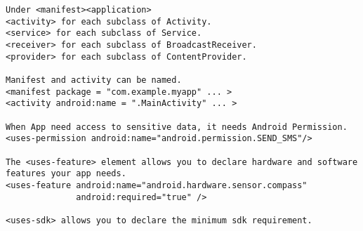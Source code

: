 \documentclass[12pt]{article}
\begin{document}
\begin{verbatim}
Under <manifest><application>
<activity> for each subclass of Activity.
<service> for each subclass of Service.
<receiver> for each subclass of BroadcastReceiver.
<provider> for each subclass of ContentProvider.

Manifest and activity can be named.
<manifest package = "com.example.myapp" ... > 
<activity android:name = ".MainActivity" ... >

When App need access to sensitive data, it needs Android Permission.
<uses-permission android:name="android.permission.SEND_SMS"/>

The <uses-feature> element allows you to declare hardware and software 
features your app needs.
<uses-feature android:name="android.hardware.sensor.compass"
              android:required="true" />

<uses-sdk> allows you to declare the minimum sdk requirement.
\end{verbatim}
\end{document}
